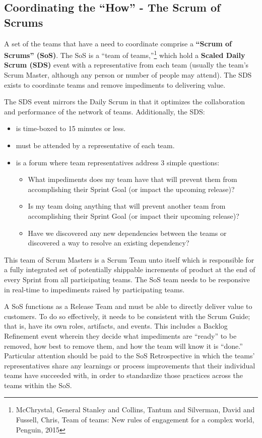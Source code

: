 \documentclass[12pt,a4paper,parskip=full]{scrartcl}
\begin{document}
\subsection{Coordinating the ``How'' - The Scrum of Scrums}
A set of the teams that have a need to coordinate comprise a
\textbf{``Scrum of Scrums'' (SoS)}. The SoS is a ``team of
teams,''\footnote{McChrystal, General Stanley and Collins, Tantum and
Silverman, David and Fussell, Chris, Team of teams: New rules of engagement
for a complex world, Penguin, 2015} which hold a \textbf{Scaled Daily Scrum
(SDS)} event with a representative from each team (usually the team's Scrum
Master, although any person or number of people may attend). The SDS exists
to coordinate teams and remove impediments to delivering value.

The SDS event mirrors the Daily Scrum in that it optimizes the
collaboration and performance of the network of teams. Additionally, the
SDS:

\begin{itemize}
\item is time-boxed to 15 minutes or less.
\item must be attended by a representative of each team.
\item is a forum where team representatives address 3 simple questions:
\begin{itemize}
\item What impediments does my team have that will prevent them from
accomplishing their Sprint Goal (or impact the upcoming release)?
\item Is my team doing anything that will prevent another team from
accomplishing their Sprint Goal (or impact their upcoming release)?
\item Have we discovered any new dependencies between the teams or
discovered a way to resolve an existing dependency?
\end{itemize}
\end{itemize}
This team of Scrum Masters is a Scrum Team unto itself which is responsible
for a fully integrated set of potentially shippable increments of product
at the end of every Sprint from all participating teams. The SoS team needs
to be responsive in real-time to impediments raised by participating teams.

A SoS functions as a Release Team and must be able to directly deliver
value to customers. To do so effectively, it needs to be consistent with
the Scrum Guide; that is, have its own roles, artifacts, and events. This
includes a Backlog Refinement event wherein they decide what impediments
are ``ready'' to be removed, how best to remove them, and how the team will
know it is ``done.'' Particular attention should be paid to the SoS
Retrospective in which the teams' representatives share any learnings or
process improvements that their individual teams have succeeded with, in
order to standardize those practices across the teams within the SoS.
\end{document}
